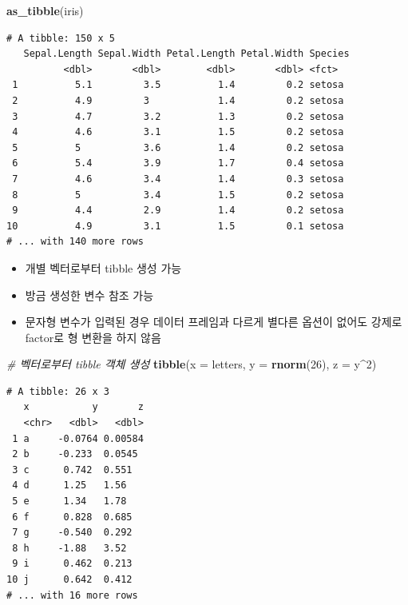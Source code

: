 \documentclass[
  11pt,
]{krantz}
\newenvironment{Shaded}{\begin{snugshade}}{\end{snugshade}}
\newcommand{\CommentTok}[1]{\textcolor[rgb]{0.37,0.37,0.37}{\textit{#1}}}
\newcommand{\DataTypeTok}[1]{\textcolor[rgb]{0.27,0.27,0.27}{#1}}
\newcommand{\DecValTok}[1]{\textcolor[rgb]{0.06,0.06,0.06}{#1}}
\newcommand{\KeywordTok}[1]{\textcolor[rgb]{0.27,0.27,0.27}{\textbf{#1}}}
\newcommand{\NormalTok}[1]{#1}
\newcommand{\OperatorTok}[1]{\textcolor[rgb]{0.43,0.43,0.43}{\textbf{#1}}}
\providecommand{\tightlist}{%
  \setlength{\itemsep}{0pt}\setlength{\parskip}{0pt}}
\begin{document}
\begin{Shaded}
\begin{Highlighting}[]
\KeywordTok{as_tibble}\NormalTok{(iris)}
\end{Highlighting}
\end{Shaded}

\begin{verbatim}
# A tibble: 150 x 5
   Sepal.Length Sepal.Width Petal.Length Petal.Width Species
          <dbl>       <dbl>        <dbl>       <dbl> <fct>  
 1          5.1         3.5          1.4         0.2 setosa 
 2          4.9         3            1.4         0.2 setosa 
 3          4.7         3.2          1.3         0.2 setosa 
 4          4.6         3.1          1.5         0.2 setosa 
 5          5           3.6          1.4         0.2 setosa 
 6          5.4         3.9          1.7         0.4 setosa 
 7          4.6         3.4          1.4         0.3 setosa 
 8          5           3.4          1.5         0.2 setosa 
 9          4.4         2.9          1.4         0.2 setosa 
10          4.9         3.1          1.5         0.1 setosa 
# ... with 140 more rows
\end{verbatim}

\normalsize

\begin{itemize}
\tightlist
\item
  개별 벡터로부터 tibble 생성 가능
\item
  방금 생성한 변수 참조 가능
\item
  문자형 변수가 입력된 경우 데이터 프레임과 다르게 별다른 옵션이 없어도 강제로 factor로 형 변환을 하지 않음
\end{itemize}

\footnotesize

\begin{Shaded}
\begin{Highlighting}[]
\CommentTok{# 벡터로부터 tibble 객체 생성}
\KeywordTok{tibble}\NormalTok{(}\DataTypeTok{x =}\NormalTok{ letters, }\DataTypeTok{y =} \KeywordTok{rnorm}\NormalTok{(}\DecValTok{26}\NormalTok{), }\DataTypeTok{z =}\NormalTok{ y}\OperatorTok{^}\DecValTok{2}\NormalTok{)}
\end{Highlighting}
\end{Shaded}

\begin{verbatim}
# A tibble: 26 x 3
   x           y       z
   <chr>   <dbl>   <dbl>
 1 a     -0.0764 0.00584
 2 b     -0.233  0.0545 
 3 c      0.742  0.551  
 4 d      1.25   1.56   
 5 e      1.34   1.78   
 6 f      0.828  0.685  
 7 g     -0.540  0.292  
 8 h     -1.88   3.52   
 9 i      0.462  0.213  
10 j      0.642  0.412  
# ... with 16 more rows
\end{verbatim}
\end{document}
